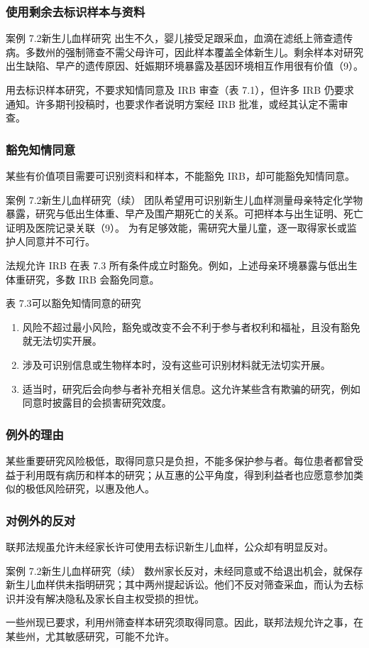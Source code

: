 \subsubsection{使用剩余去标识样本与资料}
\begin{bookbox}{案例 7.2\quad 新生儿血样研究}
出生不久，婴儿接受足跟采血，血滴在滤纸上筛查遗传病。多数州的强制筛查不需父母许可，因此样本覆盖全体新生儿。剩余样本对研究出生缺陷、早产的遗传原因、妊娠期环境暴露及基因环境相互作用很有价值（9）。
\end{bookbox}
用去标识样本研究，不要求知情同意及 IRB 审查（表 7.1），但许多 IRB 仍要求通知。许多期刊投稿时，也要求作者说明方案经 IRB 批准，或经其认定不需审查。

\subsubsection{豁免知情同意}
某些有价值项目需要可识别资料和样本，不能豁免 IRB，却可能豁免知情同意。
\begin{bookbox}{案例 7.2\quad 新生儿血样研究（续）}
团队希望用可识别新生儿血样测量母亲特定化学物暴露，研究与低出生体重、早产及围产期死亡的关系。可把样本与出生证明、死亡证明及医院记录关联（9）。
为有足够效能，需研究大量儿童，逐一取得家长或监护人同意并不可行。
\end{bookbox}
法规允许 IRB 在表 7.3 所有条件成立时豁免。例如，上述母亲环境暴露与低出生体重研究，多数 IRB 会豁免同意。
\begin{bookbox}{表 7.3\quad 可以豁免知情同意的研究}
\begin{enumerate}
\item 风险不超过最小风险，豁免或改变不会不利于参与者权利和福祉，且没有豁免就无法切实开展。
\item 涉及可识别信息或生物样本时，没有这些可识别材料就无法切实开展。
\item 适当时，研究后会向参与者补充相关信息。这允许某些含有欺骗的研究，例如同意时披露目的会损害研究效度。
\end{enumerate}
\end{bookbox}

\subsubsection{例外的理由}
某些重要研究风险极低，取得同意只是负担，不能多保护参与者。每位患者都曾受益于利用既有病历和样本的研究；从互惠的公平角度，得到利益者也应愿意参加类似的极低风险研究，以惠及他人。

\subsubsection{对例外的反对}
联邦法规虽允许未经家长许可使用去标识新生儿血样，公众却有明显反对。
\begin{bookbox}{案例 7.2\quad 新生儿血样研究（续）}
数州家长反对，未经同意或不给退出机会，就保存新生儿血样供未指明研究；其中两州提起诉讼。他们不反对筛查采血，而认为去标识并没有解决隐私及家长自主权受损的担忧。
\end{bookbox}
一些州现已要求，利用州筛查样本研究须取得同意。因此，联邦法规允许之事，在某些州，尤其敏感研究，可能不允许。

